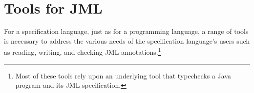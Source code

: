 \documentclass{entcs}
\begin{document}
\section{Tools for JML}
\label{tools}

For a specification language, just as for a programming language, a
range of tools is necessary to address the various needs of the
specification language's users such as reading, writing, and checking
JML annotations.\footnote{Most of these tools rely upon an underlying
  tool that typechecks a Java program and its JML specification.}

\smallskip

\end{document}
